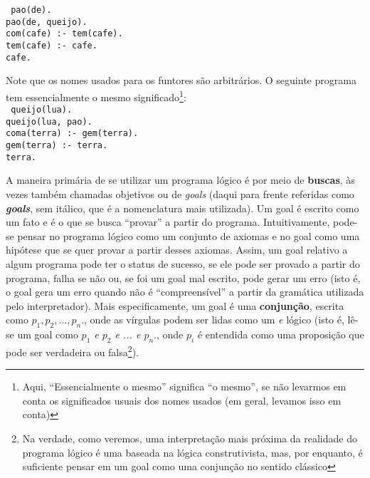 \documentclass{article}
\theoremstyle{definition}
\theoremstyle{remark}
\begin{document}
{\tt
  pao(de).\\
  pao(de, queijo).\\
  com(cafe) :- tem(cafe).\\
  tem(cafe) :- cafe.\\
  cafe.
}

Note que os nomes usados para os funtores são arbitrários. O seguinte programa tem essencialmente o mesmo significado\footnote{ Aqui, ``Essencialmente o mesmo'' significa ``o mesmo'', se não levarmos em conta os significados usuais dos nomes usados (em geral, levamos isso em conta)}:\\

{\tt
  queijo(lua).\\
  queijo(lua, pao).\\
  coma(terra) :- gem(terra).\\
  gem(terra) :- terra.\\
  terra.
}


A maneira primária de se utilizar um programa lógico é por meio de \textbf{buscas}, às vezes também chamadas objetivos ou de \textit{goals} (daqui para frente referidas como \textbf{\textit{goals}}, sem itálico, que é a nomenclatura mais utilizada). Um goal é escrito como um fato e é o que se busca ``provar'' a partir do programa. Intuitivamente, pode-se pensar no programa lógico como um conjunto de axiomas e no goal como uma hipótese que se quer provar a partir desses axiomas. Assim, um goal
relativo a algum programa pode ter o status de sucesso, se ele pode ser provado a partir do programa, falha se não ou, se foi um goal mal escrito, pode gerar um erro (isto é, o goal gera um erro quando não é ``compreensível'' a partir da gramática utilizada pelo interpretador). Mais especificamente, um goal é uma \textbf{conjunção}, escrita como \textit{$p_1,p_2,...,p_n.$}, onde as vírgulas podem ser lidas como um \textit{e} lógico (isto é, lê-se um goal como \textit{$p_1$ e $p_2$ e ... e
  $p_n.$}, onde $p_i$ é
entendida como uma proposição que pode ser verdadeira ou falsa\footnote{Na verdade, como veremos, uma interpretação mais próxima da realidade do programa lógico é uma baseada na lógica construtivista, mas, por enquanto, é suficiente pensar em um goal como uma conjunção no sentido clássico}).
\end{document}

